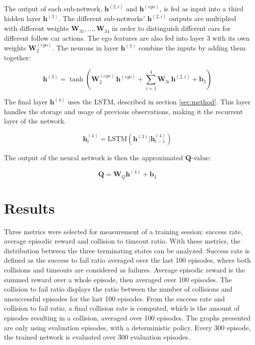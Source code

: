 The output of each sub-network, $\bm{h}^{(2, i)}$ and $\bm h^{(ego)}$,  is fed as input into a third hidden layer $\bm{h}^{(3)}$.
The different sub-networks' $\bm{h}^{(2, i)}$ outputs are multiplied with different weights $\bm{W}_{31},\dots,\bm{W}_{34}$ in order to distinguish different cars for different follow car actions. The ego features are also fed into layer 3 with its own weights $\bm{W}^{(ego)}_2$. The neurons in layer $\bm{h}^{(3)}$ combine the inputs by adding them together:

\begin{equation}
\label{eq:shared_weights}
\bm{h}^{(3)} = \tanh\left(\bm{W}^{(ego)}_{2} \, \bm h^{(ego)} + \sum_{i=1}^4 \bm{W}_{3i} \, \bm{h}^{(2, i)} + \bm{b}_3\right)
\end{equation}

The final layer $\bm{h}^{(4)}$ uses the LSTM, described in section \ref{sec:method}. This layer handles the storage and usage of previous observations, making it the recurrent layer of the network. 

\begin{equation}
\bm{h}^{(4)}_t = \text{LSTM}\left( \bm{h}^{(3)} | \bm{h}^{(4)}_{t-1} \right)
\end{equation}

The output of the neural network is then the approximated $\bm{Q}$-value:

\begin{equation}
\bm{Q} = \bm{W}_Q \bm{h}^{(4)}+ \bm{b}_4
\end{equation}

\section{Results}
\label{sec:results}
Three metrics were selected for measurement of a training session: success rate, average episodic reward and collision to timeout ratio. With these metrics, the distribution between the three terminating states can be analyzed. Success rate is defined as the success to fail ratio averaged over the last 100 episodes, where both collisions and timeouts are considered as failures. 
Average episodic reward is the summed reward over a whole episode, then averaged over 100 episodes. 
The collision to fail ratio displays the ratio between the number of collisions and unsuccessful episodes for the last 100 episodes. From the success rate and collision to fail ratio, a final collision rate is computed, which is the amount of episodes resulting in a collision, averaged over 100 episodes. 
The graphs presented are only using evaluation episodes, with a deterministic policy. Every $300$ episode, the trained network is evaluated over $300$ evaluation episodes.

